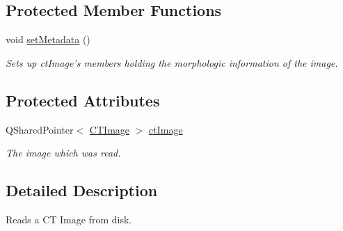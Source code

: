 \subsection*{Protected Member Functions}
\begin{DoxyCompactItemize}
\item 
\hypertarget{classctimage_1_1_c_t_image_reader_aa061965652a3eacf8a3d9a3f436a1495}{
void \hyperlink{classctimage_1_1_c_t_image_reader_aa061965652a3eacf8a3d9a3f436a1495}{setMetadata} ()}
\label{classctimage_1_1_c_t_image_reader_aa061965652a3eacf8a3d9a3f436a1495}

\begin{DoxyCompactList}\small\item\em Sets up ctImage's members holding the morphologic information of the image. \item\end{DoxyCompactList}\end{DoxyCompactItemize}
\subsection*{Protected Attributes}
\begin{DoxyCompactItemize}
\item 
\hypertarget{classctimage_1_1_c_t_image_reader_a15c76cbe2dfffac08c1a4f84463b5fc7}{
QSharedPointer$<$ \hyperlink{classctimage_1_1_c_t_image}{CTImage} $>$ \hyperlink{classctimage_1_1_c_t_image_reader_a15c76cbe2dfffac08c1a4f84463b5fc7}{ctImage}}
\label{classctimage_1_1_c_t_image_reader_a15c76cbe2dfffac08c1a4f84463b5fc7}

\begin{DoxyCompactList}\small\item\em The image which was read. \item\end{DoxyCompactList}\end{DoxyCompactItemize}


\subsection{Detailed Description}
Reads a CT Image from disk. 

